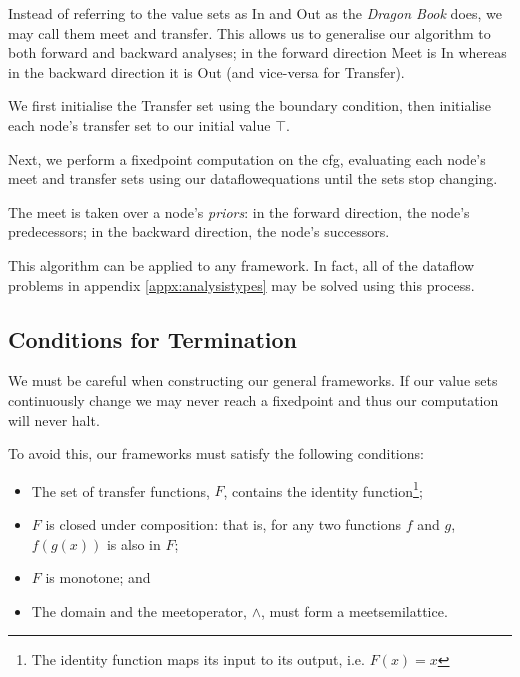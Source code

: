 \documentclass[bsc,twoside,singlespacing,parskip,logo,notimes,normalheadings]{infthesis}
\begin{document}
        Instead of referring to the value sets as In and Out as the
        {\em Dragon Book} does, we may call them \Gls{meet} and
        \Gls{transfer}. This allows us to generalise our algorithm to
        both forward and backward analyses; in the forward direction
        Meet is In whereas in the backward direction it is Out (and
        vice-versa for Transfer).
        
        We first initialise the Transfer set using the boundary
        condition, then initialise each node's transfer set to our
        initial value $\top$.
        
        Next, we perform a \gls{fixedpoint} computation on the
        \gls{cfg}, evaluating each node's \Gls{meet} and
        \Gls{transfer} sets using our \gls{dataflowequations} until
        the sets stop changing.

        The \gls{meet} is taken over a node's {\em priors}: in the
        forward direction, the node's predecessors; in the backward
        direction, the node's successors.

        This algorithm can be applied to any framework. In fact, all
        of the \gls{dataflow} problems in appendix
        \ref{appx:analysistypes} may be solved using this process.

        \subsection{Conditions for Termination}\label{sec:background-termination}
          
        We must be careful when constructing our general
        frameworks. If our value sets continuously change we may never
        reach a \gls{fixedpoint} and thus our computation will never
        halt.

        To avoid this, our frameworks must satisfy the following
        conditions\cite[p. 684]{dragonbook}:

        \begin{itemize}
        \item The set of \gls{transfer} functions, $F$, contains
          the identity function\footnote{The identity function maps
            its input to its output, i.e. $F(x)=x$};
        \item $F$ is closed under composition: that is, for any two
          functions $f$ and $g$, $f(g(x))$ is also in $F$;
        \item $F$ is monotone; and
        \item The \gls{domain} and the \gls{meetoperator}, $\land$, must
          form a \gls{meetsemilattice}.
        \end{itemize}
\end{document}
